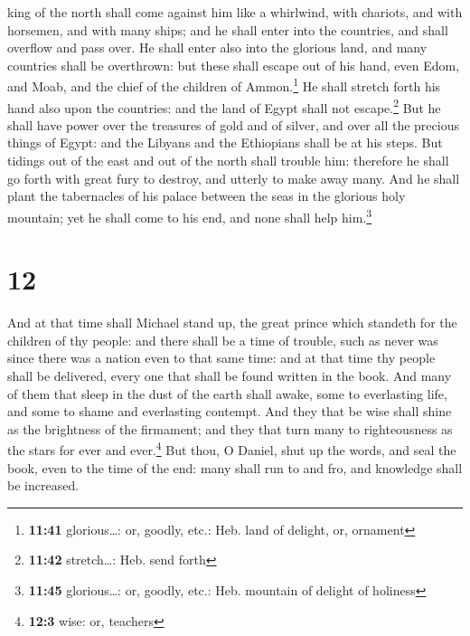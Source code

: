 king of the north shall come against him like a whirlwind, with
chariots, and with horsemen, and with many ships; and he shall enter
into the countries, and shall overflow and pass over.  He
shall enter also into the glorious land, and many countries shall be
overthrown: but these shall escape out of his hand, even Edom, and Moab,
and the chief of the children of Ammon.\footnote{\textbf{11:41}
  glorious\ldots: or, goodly, etc.: Heb. land of delight, or, ornament}
 He shall stretch forth his hand also upon the countries:
and the land of Egypt shall not escape.\footnote{\textbf{11:42}
  stretch\ldots: Heb. send forth}  But he shall have
power over the treasures of gold and of silver, and over all the
precious things of Egypt: and the Libyans and the Ethiopians shall be at
his steps.  But tidings out of the east and out of the
north shall trouble him: therefore he shall go forth with great fury to
destroy, and utterly to make away many.  And he shall
plant the tabernacles of his palace between the seas in the glorious
holy mountain; yet he shall come to his end, and none shall help
him.\footnote{\textbf{11:45} glorious\ldots: or, goodly, etc.: Heb.
  mountain of delight of holiness}

\hypertarget{section-11}{%
\section{12}\label{section-11}}

 And at that time shall Michael stand up, the great prince
which standeth for the children of thy people: and there shall be a time
of trouble, such as never was since there was a nation even to that same
time: and at that time thy people shall be delivered, every one that
shall be found written in the book.  And many of them that
sleep in the dust of the earth shall awake, some to everlasting life,
and some to shame and everlasting contempt.  And they that
be wise shall shine as the brightness of the firmament; and they that
turn many to righteousness as the stars for ever and ever.\footnote{\textbf{12:3}
  wise: or, teachers}  But thou, O Daniel, shut up the
words, and seal the book, even to the time of the end: many shall run to
and fro, and knowledge shall be increased.

